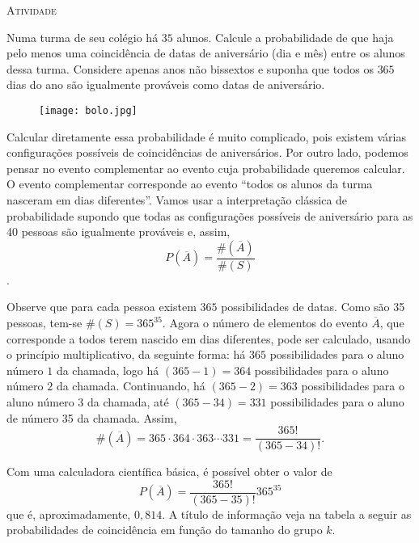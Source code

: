 \documentclass[10 pt,usenames,dvipsnames, oneside]{article}
\begin{document}
\bigskip
\begin{center}
{\large \scshape Atividade}
\end{center}
\fi

Numa turma de seu colégio há $35$ alunos. Calcule a probabilidade de que haja pelo menos uma coincidência de datas de aniversário (dia e mês) entre os alunos dessa turma. Considere apenas anos não bissextos e suponha que todos os $365$ dias do ano são igualmente prováveis como datas de aniversário.

\begin{figure}[H]
\centering

\noindent\texttt{[image: bolo.jpg]}
\end{figure}

\ifdefined\prof
\begin{solucao}

Calcular diretamente essa probabilidade é muito complicado, pois existem várias configurações possíveis de coincidências de aniversários. Por outro lado, podemos pensar no evento complementar ao evento cuja probabilidade queremos calcular. O evento complementar corresponde ao evento “todos os alunos da turma nasceram em dias diferentes”. Vamos usar a interpretação clássica de probabilidade supondo que todas as configurações possíveis de aniversário para as 40 pessoas são igualmente prováveis e, assim, 
\begin{equation*}
P(\overline{A})=\frac{\#(\overline{A})}{\#(S)}
\end{equation*}. 

Observe que para cada pessoa existem $365$ possibilidades de datas. Como são 35 pessoas, tem-se $\#(S)=365^35$. Agora o número de elementos do evento $\overline{A}$, que corresponde a todos terem nascido em dias diferentes, pode ser calculado, usando o princípio multiplicativo, da seguinte forma: há $365$ possibilidades para o aluno número $1$ da chamada, logo há $(365-1)=364$ possibilidades para o aluno número $2$ da chamada. Continuando, há $(365-2)=363$ possibilidades para o aluno número $3$ da chamada, até $(365-34)=331$ possibilidades para o aluno de número 35 da chamada. Assim, 
\begin{equation*}
\#(\overline{A})=365\cdot364\cdot363\cdots331=\frac{365!}{(365-34)!}.
\end{equation*}

Com uma calculadora científica básica, é possível obter o valor de 
\begin{equation*}
P(\overline{A})=\frac{365!}{(365−35)!}{365^35}
\end{equation*}
que é, aproximadamente, $0{,}814$. A título de informação veja na tabela a seguir as probabilidades de coincidência em função do tamanho do grupo $k$.


\end{solucao}
\end{document}
